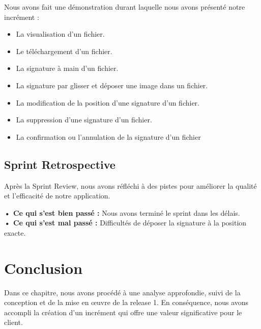 Nous avons fait une démonstration durant laquelle nous avons présenté notre incrément :
\begin{itemize}
  \item La visualisation d'un fichier.
  \item Le téléchargement d'un fichier.
  \item La signature à main d'un fichier.
  \item La signature par glisser et déposer une image dans un fichier.
  \item La modification de la position d'une signature d'un fichier.
  \item La suppression d'une signature d'un fichier.
  \item La confirmation ou l'annulation de la signature d'un fichier
\end{itemize}

\subsection{Sprint Retrospective}

Après la Sprint Review, nous avons réfléchi à des pistes pour améliorer la qualité et l'efficacité de notre application.


\noindent\textbf{• Ce qui s'est bien passé :}
Nous avons terminé le sprint dans les délais.\\
\noindent\textbf{• Ce qui s'est mal passé :}   Difficultés de déposer la signature à la position exacte.


\section*{Conclusion}

Dans ce chapitre, nous avons procédé à une analyse approfondie, suivi de la conception et de la mise en œuvre de la release 1. En conséquence, nous avons accompli la création d'un incrément qui offre une valeur significative pour le client.